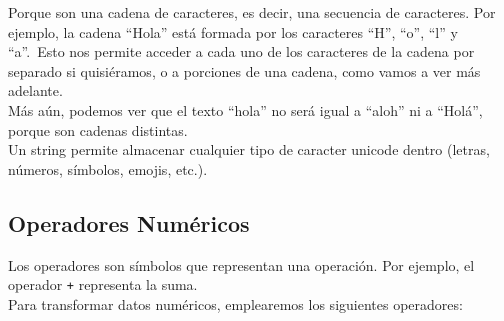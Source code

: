\documentclass[
  letterpaper,
  DIV=11,
  numbers=noendperiod]{scrreprt}
\begin{document}
\begin{tcolorbox}[enhanced jigsaw, bottomrule=.15mm, leftrule=.75mm, opacityback=0, colback=white, toprule=.15mm, bottomtitle=1mm, opacitybacktitle=0.6, rightrule=.15mm, left=2mm, arc=.35mm, coltitle=black, title=\textcolor{quarto-callout-note-color}{\faInfo}\hspace{0.5em}{¿Por qué se llaman ``cadenas de caracteres''?}, breakable, toptitle=1mm, colframe=quarto-callout-note-color-frame, titlerule=0mm, colbacktitle=quarto-callout-note-color!10!white]

Porque son una cadena de caracteres, es decir, una secuencia de
caracteres. Por ejemplo, la cadena ``Hola'' está formada por los
caracteres ``H'', ``o'', ``l'' y ``a''.~Esto nos permite acceder a cada
uno de los caracteres de la cadena por separado si quisiéramos, o a
porciones de una cadena, como vamos a ver más adelante.\\
Más aún, podemos ver que el texto ``hola'' no será igual a ``aloh'' ni a
``Holá'', porque son cadenas distintas.\\
Un string permite almacenar cualquier tipo de caracter unicode dentro
(letras, números, símbolos, emojis, etc.).

\end{tcolorbox}

\subsection{Operadores Numéricos}\label{operadores-numuxe9ricos}

Los operadores son símbolos que representan una operación. Por ejemplo,
el operador \texttt{+} representa la suma.\\

Para transformar datos numéricos, emplearemos los siguientes operadores:
\end{document}
